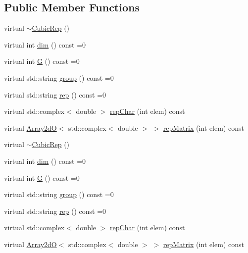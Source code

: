 \subsection*{Public Member Functions}
\begin{DoxyCompactItemize}
\item 
virtual \mbox{\hyperlink{structHadron_1_1CubicRep_a8daf9ed601e434933082fd1cc4fec396}{$\sim$\+Cubic\+Rep}} ()
\item 
virtual int \mbox{\hyperlink{structHadron_1_1CubicRep_ac178d14064f037a66af4b9fb4b312d51}{dim}} () const =0
\item 
virtual int \mbox{\hyperlink{structHadron_1_1CubicRep_a52104e43266d1614c00bbd1c3b395458}{G}} () const =0
\item 
virtual std\+::string \mbox{\hyperlink{structHadron_1_1CubicRep_a0748f11ec87f387062c8e8981339a29c}{group}} () const =0
\item 
virtual std\+::string \mbox{\hyperlink{structHadron_1_1CubicRep_ac3eb63608803d44c68681f158e14eb1b}{rep}} () const =0
\item 
virtual std\+::complex$<$ double $>$ \mbox{\hyperlink{structHadron_1_1CubicRep_af45227106e8e715e84b0af69cd3b36f8}{rep\+Char}} (int elem) const
\item 
virtual \mbox{\hyperlink{classADAT_1_1Array2dO}{Array2dO}}$<$ std\+::complex$<$ double $>$ $>$ \mbox{\hyperlink{structHadron_1_1CubicRep_ac5d7e9e6f4ab1158b5fce3e4ad9e8005}{rep\+Matrix}} (int elem) const
\item 
virtual \mbox{\hyperlink{structHadron_1_1CubicRep_a8daf9ed601e434933082fd1cc4fec396}{$\sim$\+Cubic\+Rep}} ()
\item 
virtual int \mbox{\hyperlink{structHadron_1_1CubicRep_ac178d14064f037a66af4b9fb4b312d51}{dim}} () const =0
\item 
virtual int \mbox{\hyperlink{structHadron_1_1CubicRep_a52104e43266d1614c00bbd1c3b395458}{G}} () const =0
\item 
virtual std\+::string \mbox{\hyperlink{structHadron_1_1CubicRep_a0748f11ec87f387062c8e8981339a29c}{group}} () const =0
\item 
virtual std\+::string \mbox{\hyperlink{structHadron_1_1CubicRep_ac3eb63608803d44c68681f158e14eb1b}{rep}} () const =0
\item 
virtual std\+::complex$<$ double $>$ \mbox{\hyperlink{structHadron_1_1CubicRep_af45227106e8e715e84b0af69cd3b36f8}{rep\+Char}} (int elem) const
\item 
virtual \mbox{\hyperlink{classADAT_1_1Array2dO}{Array2dO}}$<$ std\+::complex$<$ double $>$ $>$ \mbox{\hyperlink{structHadron_1_1CubicRep_ac5d7e9e6f4ab1158b5fce3e4ad9e8005}{rep\+Matrix}} (int elem) const

\end{DoxyCompactItemize}
